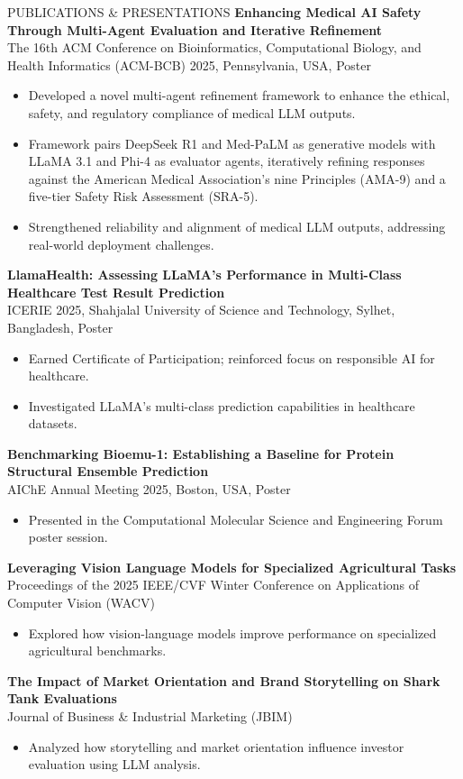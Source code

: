 \documentclass{resume} %
\begin{document}
\begin{rSection}{PUBLICATIONS \& PRESENTATIONS}
\textbf{Enhancing Medical AI Safety Through Multi-Agent Evaluation and Iterative Refinement} \\
The 16th ACM Conference on Bioinformatics, Computational Biology, and Health Informatics (ACM-BCB) 2025, Pennsylvania, USA, Poster
\begin{itemize}
    \item Developed a novel multi-agent refinement framework to enhance the ethical, safety, and regulatory compliance of medical LLM outputs.
    \item Framework pairs DeepSeek R1 and Med-PaLM as generative models with LLaMA 3.1 and Phi-4 as evaluator agents, iteratively refining responses against the American Medical Association's nine Principles (AMA-9) and a five-tier Safety Risk Assessment (SRA-5).
    \item Strengthened reliability and alignment of medical LLM outputs, addressing real-world deployment challenges.
\end{itemize}

\textbf{LlamaHealth: Assessing LLaMA's Performance in Multi-Class Healthcare Test Result Prediction} \\
ICERIE 2025, Shahjalal University of Science and Technology, Sylhet, Bangladesh, Poster
\begin{itemize}
    \item Earned Certificate of Participation; reinforced focus on responsible AI for healthcare.
    \item Investigated LLaMA's multi-class prediction capabilities in healthcare datasets.
\end{itemize}

\textbf{Benchmarking Bioemu-1: Establishing a Baseline for Protein Structural Ensemble Prediction} \\
AIChE Annual Meeting 2025, Boston, USA, Poster
\begin{itemize}
    \item Presented in the Computational Molecular Science and Engineering Forum poster session.
\end{itemize}

\textbf{Leveraging Vision Language Models for Specialized Agricultural Tasks} \\
Proceedings of the 2025 IEEE/CVF Winter Conference on Applications of Computer Vision (WACV)
\begin{itemize}
    \item Explored how vision-language models improve performance on specialized agricultural benchmarks.
\end{itemize}

\textbf{The Impact of Market Orientation and Brand Storytelling on Shark Tank Evaluations} \\
Journal of Business \& Industrial Marketing (JBIM)
\begin{itemize}
    \item Analyzed how storytelling and market orientation influence investor evaluation using LLM analysis.
\end{itemize}

\end{rSection}
\end{document}
